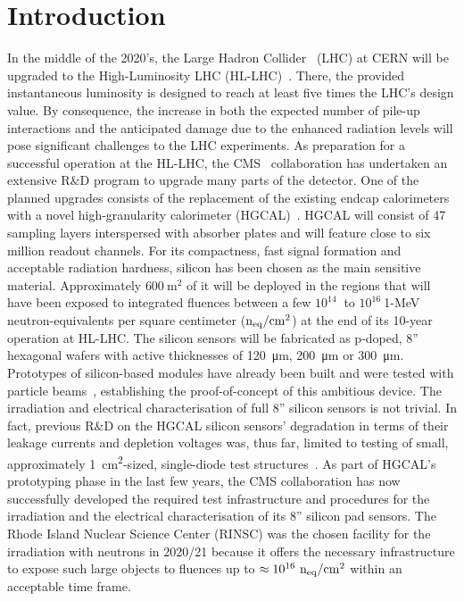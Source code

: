 \section{Introduction}
\label{sec:introduction}
In the middle of the 2020's, the Large Hadron Collider~\cite{evans:2008} (LHC) at CERN will be upgraded to the High-Luminosity LHC (HL-LHC)~\cite{hl-lhc-tdr:2017}.
There, the provided instantaneous luminosity is designed to reach at least five times the LHC's design value.
By consequence, the increase in both the expected number of pile-up interactions and the anticipated damage due to the enhanced radiation levels will pose significant challenges to the LHC experiments.
As preparation for a successful operation at the HL-LHC, the CMS~\cite{cms:2008} collaboration has undertaken an extensive R$\&$D program to upgrade many parts of the detector.
One of the planned upgrades consists of the replacement of the existing endcap calorimeters with a novel high-granularity calorimeter (HGCAL)~\cite{hgcal-tdr:2018}.
HGCAL will consist of 47 sampling layers interspersed with absorber plates and will feature close to six million readout channels.
For its compactness, fast signal formation and acceptable radiation hardness, silicon has been chosen as the main sensitive material.
Approximately $\SI{600}{\metre\squared}$ of it will be deployed in the regions that will have been exposed to integrated fluences between a few $10^{14}~$ to $10^{16}~$1-MeV neutron-equivalents per square centimeter ($\mathrm{n_{eq}}/\mathrm{cm}^{2}$) at the end of its 10-year operation at HL-LHC. 
The silicon sensors will be fabricated as p-doped, 8'' hexagonal wafers with active thicknesses of \SI{120}{\micro\metre}, \SI{200}{\micro\metre} or \SI{300}{\micro\metre}.
Prototypes of silicon-based modules have already been built and were tested with particle beams~\cite{cms_hgc-2016-beamtests,H1:2020,H2:2020}, establishing the proof-of-concept of this ambitious device.
The irradiation and electrical characterisation of full 8'' silicon sensors is not trivial.
In fact, previous R$\&$D on the HGCAL silicon sensors' degradation in terms of their leakage currents and depletion voltages was, thus far, limited to testing of small, approximately \SI{1}{\centi\metre\squared}-sized, single-diode test structures~\cite{Curr_s_2017}.
As part of HGCAL's prototyping phase in the last few years, the CMS collaboration has now successfully developed the required test infrastructure and procedures for the irradiation and the electrical characterisation of its 8'' silicon pad sensors.
The Rhode Island Nuclear Science Center (RINSC) was the chosen facility for the irradiation with neutrons in 2020/21 because it offers the necessary infrastructure to expose such large objects to fluences up to $\approx 10^{16}~\mathrm{n_{eq}}/\mathrm{cm}^{2}$ within an acceptable time frame.
